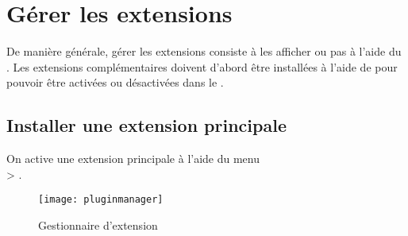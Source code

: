 \section{Gérer les extensions}\label{sec:managing_plugins}

De manière générale, gérer les extensions consiste à les afficher ou pas à l'aide du .
Les extensions complémentaires doivent d'abord être installées à l'aide de  pour pouvoir être activées ou désactivées dans le .

\subsection{Installer une extension principale}\label{sec:load_core_plugin} 

On active une extension principale à l'aide du menu\\  > .

\begin{figure}[ht]
   \begin{center}
   \texttt{[image: pluginmanager]}
   \caption{Gestionnaire d'extension \nixcaption}\label{fig:pluginmanager}
\end{center}
\end{figure}

